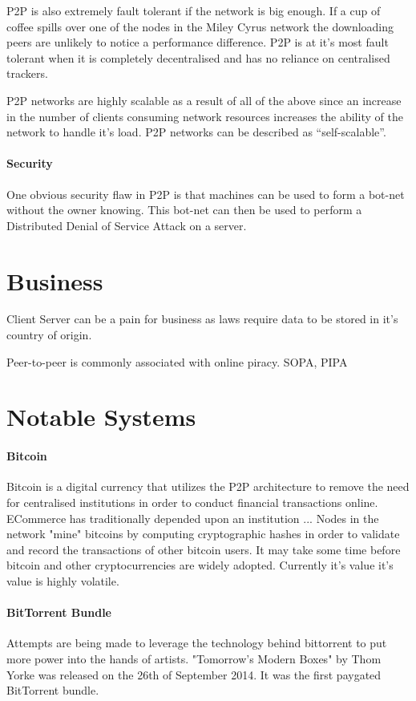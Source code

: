 \documentclass[11pt]{amsart}
\begin{document}
\indent P2P is also extremely fault tolerant if the network is big enough. If a cup of coffee spills over one of the nodes in the Miley Cyrus network the downloading peers are unlikely to notice a performance difference.
P2P is at it's most fault tolerant when it is completely decentralised and has no reliance on centralised trackers.

\indent P2P networks are highly scalable as a result of all of the above since an increase in the number of clients consuming network resources increases the ability of the network to handle it's load. P2P networks can be described as ``self-scalable''.

\subsection{Security}

One obvious security flaw in P2P is that machines can be used to form a bot-net without the owner knowing. This bot-net can then be used to perform a Distributed Denial of Service Attack on a server.

\part{Business}

Client Server can be a pain for business as laws require data to be stored in it's country of origin.

Peer-to-peer is commonly associated with online piracy. SOPA, PIPA

\part{Notable Systems}
\subsection{Bitcoin} 

Bitcoin is a digital currency that utilizes the P2P architecture to remove the need for centralised institutions in order to conduct financial transactions online. ECommerce has traditionally depended upon an institution ... 
Nodes in the network "mine" bitcoins by computing cryptographic hashes in order to validate and record the transactions of other bitcoin users. It may take some time before bitcoin and other cryptocurrencies are widely adopted. Currently it's value it's value is highly volatile.

\subsection{BitTorrent Bundle}
Attempts are being made to leverage the technology behind bittorrent to put more power into the hands of artists. "Tomorrow's Modern Boxes" by Thom Yorke was released on the 26th of September 2014. It was the first paygated BitTorrent bundle.
\end{document}
